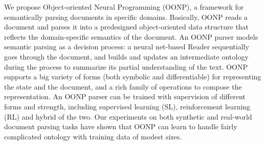 We propose Object-oriented Neural Programming (OONP), a framework for semantically parsing documents in specific domains. Basically, OONP reads a document and parses it into a predesigned object-oriented data structure that reflects the domain-specific semantics of the document. An OONP parser models semantic parsing as a decision process: a neural net-based Reader sequentially goes through the document, and builds and updates an intermediate ontology during the process to summarize its partial understanding of the text. OONP supports a big variety of forms (both symbolic and differentiable) for representing the state and the document, and a rich family of operations to compose the representation. An OONP parser can be trained with supervision of different forms and strength, including supervised learning (SL), reinforcement learning (RL) and hybrid of the two. Our experiments on both synthetic and real-world document parsing tasks have shown that OONP can learn to handle fairly complicated ontology with training data of modest sizes.
